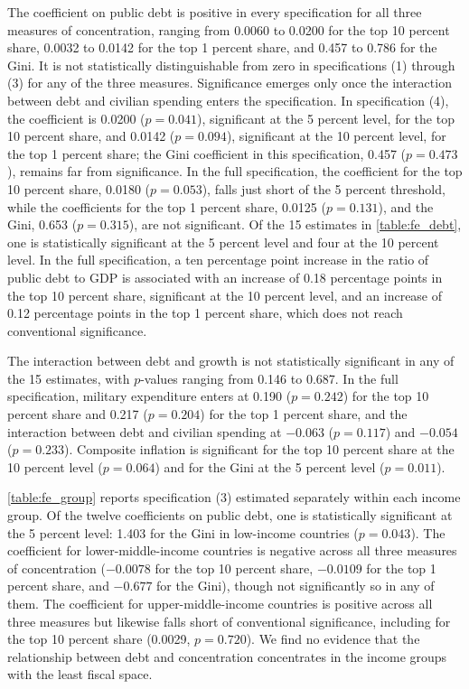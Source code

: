 \documentclass[12pt, titlepage]{article}
\numberwithin{equation}{section}
\begin{document}
The coefficient on public debt is positive in every specification for all three
measures of concentration, ranging from 0.0060 to 0.0200 for the top 10 percent
share, 0.0032 to 0.0142 for the top 1 percent share, and 0.457 to 0.786 for the
Gini. It is not statistically distinguishable from zero in specifications (1)
through (3) for any of the three measures. Significance emerges only once the
interaction between debt and civilian spending enters the specification. In
specification (4), the coefficient is 0.0200 ($p = 0.041$), significant at the
5 percent level, for the top 10 percent share, and 0.0142 ($p = 0.094$),
significant at the 10 percent level, for the top 1 percent share; the Gini
coefficient in this specification, 0.457 ($p = 0.473$), remains far from
significance. In the full specification, the coefficient for the top 10
percent share, 0.0180 ($p = 0.053$), falls just short of the 5 percent
threshold, while the coefficients for the top 1 percent share, 0.0125
($p = 0.131$), and the Gini, 0.653 ($p = 0.315$), are not significant. Of the
15 estimates in \autoref{table:fe_debt}, one is statistically significant at
the 5 percent level and four at the 10 percent level. In the full
specification, a ten percentage point increase in the ratio of public debt to
GDP is associated with an increase of 0.18 percentage points in the top 10
percent share, significant at the 10 percent level, and an increase of 0.12
percentage points in the top 1 percent share, which does not reach
conventional significance.

The interaction between debt and growth is not statistically significant in
any of the 15 estimates, with $p$-values ranging from 0.146 to 0.687. In the
full specification, military expenditure enters at 0.190 ($p = 0.242$) for
the top 10 percent share and 0.217 ($p = 0.204$) for the top 1 percent share,
and the interaction between debt and civilian spending at $-0.063$
($p = 0.117$) and $-0.054$ ($p = 0.233$). Composite inflation is significant
for the top 10 percent share at the 10 percent level ($p = 0.064$) and for the
Gini at the 5 percent level ($p = 0.011$).

\autoref{table:fe_group} reports specification (3) estimated separately within
each income group. Of the twelve coefficients on public debt, one is
statistically significant at the 5 percent level: 1.403 for the Gini in
low-income countries ($p = 0.043$). The coefficient for lower-middle-income
countries is negative across all three measures of concentration ($-0.0078$
for the top 10 percent share, $-0.0109$ for the top 1 percent share, and
$-0.677$ for the Gini), though not significantly so in any of them. The
coefficient for upper-middle-income countries is positive across all three
measures but likewise falls short of conventional significance, including for
the top 10 percent share (0.0029, $p = 0.720$). We find no evidence that the
relationship between debt and concentration concentrates in the income groups
with the least fiscal space.
\end{document}
